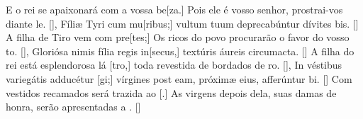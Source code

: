 {    {E o rei se apaixonará com a vossa be[za.] Pois ele é vosso senhor, prostrai-vos diante le. [\LinkPT]},
  {Fíliæ Tyri cum mu[ribus;] vultum tuum deprecabúntur dívites bis. [\LinkLA]}%
    {A filha de Tiro vem com pre[tes;] Os ricos do povo procurarão o favor do vosso to. [\LinkPT]},
  {Gloriósa nimis fília regis in[secus,] textúris áureis circumacta. [\LinkLA]}%
    {A filha do rei está esplendorosa lá [tro,] toda revestida de bordados de ro. [\LinkPT]},
  {In véstibus variegátis adducétur [gi;] vírgines post eam, próximæ eius, afferúntur bi. [\LinkLA]}%
    {Com vestidos recamados será trazida ao [.] As virgens depois dela, suas damas de honra, serão apresentadas a . [\LinkPT]}
}